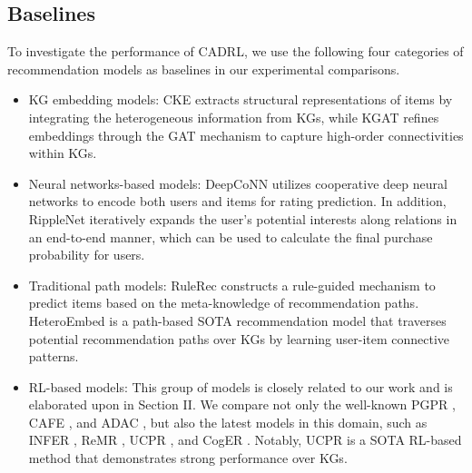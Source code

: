 \documentclass[conference]{IEEEtran}
\begin{document}
\subsection{Baselines}
To investigate the performance of CADRL, we use the following four categories of recommendation models as baselines in our experimental comparisons. 
\begin{itemize}
\item KG embedding models: CKE \cite{CKE} extracts structural representations of items by integrating  the heterogeneous information from KGs, while KGAT \cite{KGAT} refines embeddings through the GAT mechanism to capture high-order connectivities within KGs.

\item Neural networks-based models: DeepCoNN  \cite{DeepCoNN} utilizes  cooperative deep neural networks  to encode both users and items for rating prediction. In addition, RippleNet \cite{Ripplenet} iteratively expands the user's potential interests along relations in an end-to-end manner, which can be used to calculate the final purchase probability for users. 

\item Traditional path models: RuleRec \cite{KGRSrules} constructs a rule-guided mechanism to predict items based on the meta-knowledge of recommendation paths. HeteroEmbed \cite{HeteroEmbed} is a path-based SOTA recommendation model that traverses potential recommendation paths over KGs by learning user-item connective patterns. 

\item RL-based models:  This group of models is closely related to our work and is elaborated upon in Section II. We compare not only the well-known PGPR \cite{PGPR}, CAFE \cite{CAFE}, and ADAC \cite{ADAC}, but also the latest models in this domain, such as INFER \cite{INFER}, ReMR \cite{ReMR}, UCPR \cite{UCPR}, and CogER \cite{CogER}. Notably, UCPR \cite{UCPR} is a SOTA RL-based method that demonstrates strong performance over KGs.


\end{itemize}
\end{document}
